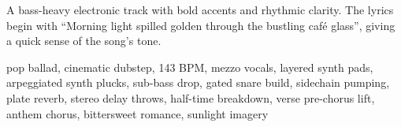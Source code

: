 

\begin{notes}
A bass-heavy electronic track with bold accents and rhythmic clarity. %
The lyrics begin with “Morning light spilled golden through the bustling café glass”, giving a quick sense of the song’s tone.
\end{notes}

\begin{style}
pop ballad, cinematic dubstep, 143 BPM, mezzo vocals, layered synth pads, arpeggiated synth plucks, sub-bass drop, gated snare build, sidechain pumping, plate reverb, stereo delay throws, half-time breakdown, verse pre-chorus lift, anthem chorus, bittersweet romance, sunlight imagery
\end{style}

